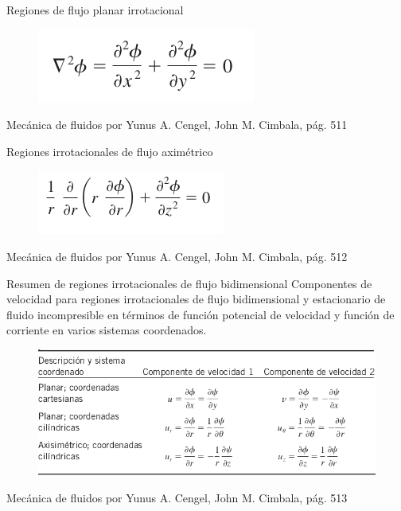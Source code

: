 
\begin{frame}{Regiones de flujo planar irrotacional}
\justifying
\begin{figure}[H]
\centering
\includegraphics[scale=0.35]{Section_Files/S3-imagenes-Jhon/0072.png}
\end{figure}
{\tiny Mecánica de fluidos por Yunus A. Cengel, John M. Cimbala, pág. 511}
\end{frame}


\begin{frame}{Regiones irrotacionales de flujo aximétrico}
\justifying
\begin{figure}[H]
\centering
\includegraphics[scale=0.35]{Section_Files/S3-imagenes-Jhon/0081.png}
\end{figure}
{\tiny Mecánica de fluidos por Yunus A. Cengel, John M. Cimbala, pág. 512}
\end{frame}


\begin{frame}{Resumen de regiones irrotacionales de flujo bidimensional}
\justifying
Componentes de velocidad para regiones irrotacionales de flujo bidimensional y estacionario de fluido incompresible en términos de función potencial de velocidad y función de corriente en varios sistemas coordenados.
\begin{figure}[H]
\centering
\includegraphics[scale=0.35]{Section_Files/S3-imagenes-Jhon/0088.png}
\end{figure}
{\tiny Mecánica de fluidos por Yunus A. Cengel, John M. Cimbala, pág. 513}
\end{frame}

